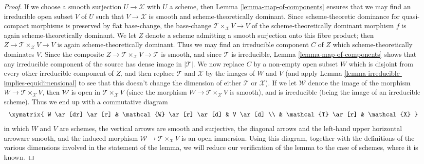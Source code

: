 \begin{proof}
\medskip\noindent
If we choose a smooth surjection $U \to \mathcal{X}$ with $U$ a scheme,
then Lemma \ref{lemma-map-of-components} ensures that
we may find an irreducible open subset $V$ of $U$ such
that $V \to \mathcal{X}$ is smooth and scheme-theoretically dominant.
Since scheme-theoretic dominance for quasi-compact morphisms
is preserved by flat base-change,
the base-change $\mathcal{T} \times_{\mathcal{X}} V \to V$
of the scheme-theoretically
dominant morphism $f$ is again
scheme-theoretically dominant.   We let $Z$ denote a scheme
admitting a smooth surjection onto this fibre product;
then $Z \to \mathcal{T} \times_{\mathcal{X}} V \to V$
is again scheme-theoretically dominant.
Thus we may find an irreducible
component $C$ of $Z$ which scheme-theoretically
dominates $V$.
Since the composite  $Z \to \mathcal{T}\times_{\mathcal{X}} V \to \mathcal{T}$
is smooth,
and since $\mathcal{T}$ is irreducible,
Lemma \ref{lemma-map-of-components} shows that any irreducible
component of the source has dense image in $|\mathcal{T}|$.
We now replace
$C$ by a non-empty open subset $W$ which is disjoint from every other
irreducible component of $Z$, and
then replace $\mathcal{T}$ and $\mathcal{X}$ by the images of $W$
and $V$
(and apply Lemma \ref{lemma-irreducible-implies-equidimensional}
to see that this
doesn't change the dimension of either $\mathcal{T}$ or $\mathcal{X}$).
If we let $\mathcal{W}$ denote the image of the morphism
$W \to \mathcal{T}\times_{\mathcal{X}} V$,
then $\mathcal{W}$ is open in $\mathcal{T}\times_{\mathcal{X}} V$ (since the
morphism $W \to \mathcal{T}\times_{\mathcal{X}} V$ is smooth),
and is irreducible (being the image of an irreducible
scheme).  Thus we end up with a commutative diagram
$$
\xymatrix{
W \ar[dr] \ar[r]  & \mathcal{W} \ar[r] \ar[d] & V \ar[d] \\
& \mathcal{T} \ar[r] & \mathcal{X}
}
$$
in which $W$ and $V$ are schemes,
the vertical arrows are smooth and surjective,
the diagonal arrows and the left-hand
upper horizontal arroware smooth,
and the induced morphism $\mathcal{W} \to \mathcal{T}\times_{\mathcal{X}} V$ is
an open immersion. Using this diagram, together with the definitions
of the various dimensions involved in
the statement of the lemma, we will reduce our verification
of the lemma to the case of schemes, where it is known.


\end{proof}
